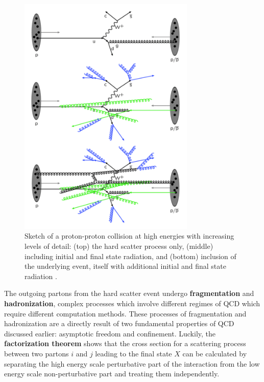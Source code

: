 \begin{figure}
	\centering
	\includegraphics[width=0.75\textwidth]{proton_collision_complications}
	\caption{
	Sketch of a proton-proton collision at high energies with increasing levels of detail: (top) the hard scatter process only, (middle) including initial and final state radiation, and (bottom) inclusion of the underlying event, itself with additional initial and final state radiation \cite{Bechtel:2009zza}.
	}
	\label{fig:proton_collision_complications}
\end{figure}

The outgoing partons from the hard scatter event undergo \textbf{fragmentation} and \textbf{hadronization}, complex processes which involve different regimes of QCD which require different computation methods.
These processes of fragmentation and hadronization are a directly result of two fundamental properties of QCD discussed earlier: asymptotic freedom and confinement.
Luckily, the \textbf{factorization theorem} shows that the cross section for a scattering process between two partons $i$ and $j$ leading to the final state $X$ can be calculated by separating the high energy scale perturbative part of the interaction from the low energy scale non-perturbative part and treating them independently.

